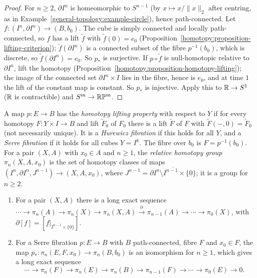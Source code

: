 \begin{proof}
For $n \geq 2$, $\partial I^n$ is homeomorphic to $S^{n-1}$ (by $x \mapsto x/\|x\|_2$ after centring, as in Example~\ref{general-topology:example-circle}), hence
path-connected. Let $f \colon (I^n, \partial I^n) \to (B, b_0)$. The cube is simply connected and locally path-connected, so $f$ has a lift $\tilde{f}$ with
$\tilde{f}(0) = e_0$ (Proposition~\ref{homotopy:proposition-lifting-criterion}); $\tilde{f}(\partial I^n)$ is a connected subset of the fibre $p^{-1}(b_0)$, which
is discrete, so $\tilde{f}(\partial I^n) = e_0$. So $p_*$ is surjective. If $p \circ \tilde{f}$ is null-homotopic relative to $\partial I^n$, lift the homotopy
(Proposition~\ref{homotopy:proposition-homotopy-lifting}); the image of the connected set $\partial I^n \times I$ lies in the fibre, hence is $e_0$, and at time $1$ the
lift of the constant map is constant. So $p_*$ is injective. Apply this to $\mathbb{R} \to S^1$ ($\mathbb{R}$ is contractible) and $S^m \to \mathbb{R}\mathbb{P}^m$.
\end{proof}

\begin{definition}\label{homotopy:definition-fibration}
A map $p \colon E \to B$ has the \emph{homotopy lifting property} with respect to $Y$ if for every homotopy $F \colon Y \times I \to B$ and lift $\tilde{F}_0$ of $F_0$ there
is a lift $\tilde{F}$ of $F$ with $\tilde{F}(-, 0) = \tilde{F}_0$ (not necessarily unique). It is a \emph{Hurewicz fibration} if this holds for all $Y$, and a
\emph{Serre fibration} if it holds for all cubes $Y = I^k$. The fibre over $b_0$ is $F = p^{-1}(b_0)$. For a pair $(X, A)$ with $x_0 \in A$ and $n \geq 1$, the
\emph{relative homotopy group} $\pi_n(X, A, x_0)$ is the set of homotopy classes of maps $(I^n, \partial I^n, J^{n-1}) \to (X, A, x_0)$, where
$J^{n-1} = \overline{\partial I^n \setminus I^{n-1} \times \{0\}}$; it is a group for $n \geq 2$.
\end{definition}

\begin{theorem}\label{homotopy:theorem-long-exact-sequences}
\begin{enumerate}
\item For a pair $(X, A)$ there is a long exact sequence
$\cdots \to \pi_n(A) \to \pi_n(X) \to \pi_n(X, A) \xrightarrow{\partial} \pi_{n-1}(A) \to \cdots \to \pi_0(X)$, with $\partial[f] = [f|_{I^{n-1} \times \{0\}}]$.
\item For a Serre fibration $p \colon E \to B$ with $B$ path-connected, fibre $F$ and $x_0 \in F$, the map $p_* \colon \pi_n(E, F, x_0) \to \pi_n(B, b_0)$ is an
isomorphism for $n \geq 1$, which gives a long exact sequence
\[
\cdots \to \pi_n(F) \to \pi_n(E) \to \pi_n(B) \to \pi_{n-1}(F) \to \cdots \to \pi_0(E) \to 0.
\]
\end{enumerate}
\end{theorem}

